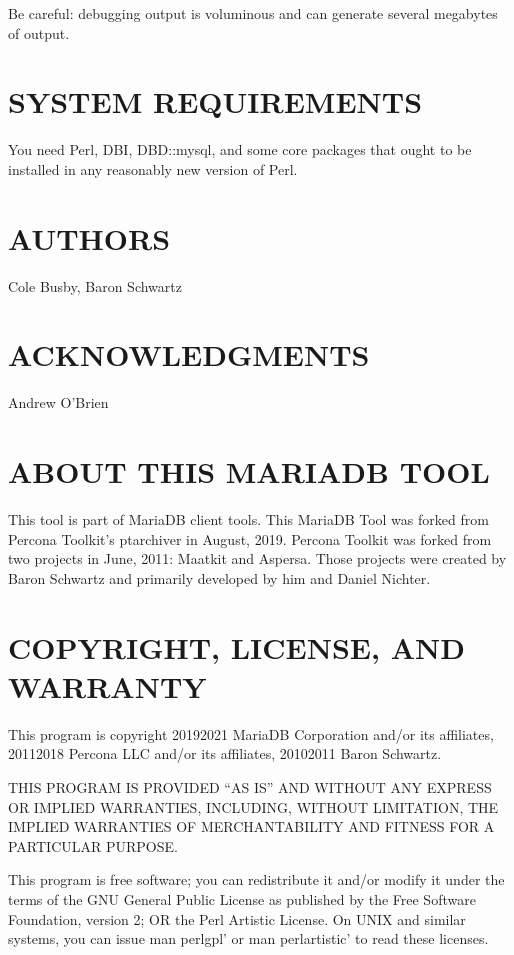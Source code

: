 \documentclass[letterpaper,10pt,english]{sphinxmanual}
\begin{document}
Be careful: debugging output is voluminous and can generate several megabytes
of output.


\section{SYSTEM REQUIREMENTS}
\label{\detokenize{mariadb-archiver:system-requirements}}
You need Perl, DBI, DBD::mysql, and some core packages that ought to be
installed in any reasonably new version of Perl.


\section{AUTHORS}
\label{\detokenize{mariadb-archiver:authors}}
Cole Busby, Baron Schwartz


\section{ACKNOWLEDGMENTS}
\label{\detokenize{mariadb-archiver:acknowledgments}}
Andrew O’Brien


\section{ABOUT THIS MARIADB TOOL}
\label{\detokenize{mariadb-archiver:about-this-mariadb-tool}}
This tool is part of MariaDB client tools. This MariaDB Tool was forked from
Percona Toolkit’s pt\sphinxhyphen{}archiver in August, 2019. Percona Toolkit was forked from two
projects in June, 2011: Maatkit and Aspersa.  Those projects were created by
Baron Schwartz and primarily developed by him and Daniel Nichter.


\section{COPYRIGHT, LICENSE, AND WARRANTY}
\label{\detokenize{mariadb-archiver:copyright-license-and-warranty}}
This program is copyright 2019\sphinxhyphen{}2021 MariaDB Corporation and/or its affiliates,
2011\sphinxhyphen{}2018 Percona LLC and/or its affiliates, 2010\sphinxhyphen{}2011 Baron Schwartz.

THIS PROGRAM IS PROVIDED “AS IS” AND WITHOUT ANY EXPRESS OR IMPLIED
WARRANTIES, INCLUDING, WITHOUT LIMITATION, THE IMPLIED WARRANTIES OF
MERCHANTABILITY AND FITNESS FOR A PARTICULAR PURPOSE.

This program is free software; you can redistribute it and/or modify it under
the terms of the GNU General Public License as published by the Free Software
Foundation, version 2; OR the Perl Artistic License.  On UNIX and similar
systems, you can issue \textasciigrave{}man perlgpl’ or \textasciigrave{}man perlartistic’ to read these
licenses.
\end{document}
